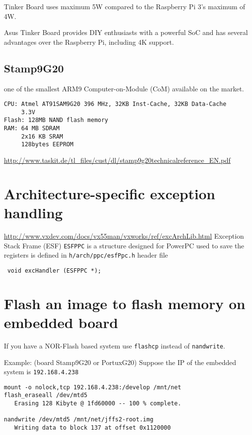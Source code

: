 Tinker Board uses maximum 5W compared to the Raspberry Pi 3’s maximum of 4W.

Asus Tinker Board provides DIY enthusiasts with a powerful SoC and has several
advantages over the Raspberry Pi, including 4K support.



\subsection{Stamp9G20 }
\label{sec:Stamp9G20}

 one of the smallest ARM9 Computer-on-Module (CoM) available on the market.
 \begin{verbatim}
CPU: Atmel AT91SAM9G20 396 MHz, 32KB Inst-Cache, 32KB Data-Cache
     3.3V
Flash: 128MB NAND flash memory
RAM: 64 MB SDRAM
     2x16 KB SRAM
     128bytes EEPROM       
 \end{verbatim}
\url{http://www.taskit.de/tl_files/cust/dl/stamp9g20technicalreference_EN.pdf}

\section{Architecture-specific exception handling}


\url{http://www.vxdev.com/docs/vx55man/vxworks/ref/excArchLib.html}
Exception Stack Frame (ESF) \verb!ESFPPC! is a structure designed for PowerPC
used to save the registers is defined in \verb!h/arch/ppc/esfPpc.h! header file

\begin{verbatim}
 void excHandler (ESFPPC *);
\end{verbatim}

\section{Flash an image to flash memory on embedded board}

If you have a NOR-Flash based system use \verb!flashcp! instead of
\verb!nandwrite!.

Example: (board Stamp9G20 or PortuxG20)
Suppose the IP of the embedded system is \verb!192.168.4.238!
\begin{verbatim}
mount -o nolock,tcp 192.168.4.238:/develop /mnt/net
flash_eraseall /dev/mtd5
   Erasing 128 Kibyte @ 1fd60000 -- 100 % complete.

nandwrite /dev/mtd5 /mnt/net/jffs2-root.img
   Writing data to block 137 at offset 0x1120000
\end{verbatim}

